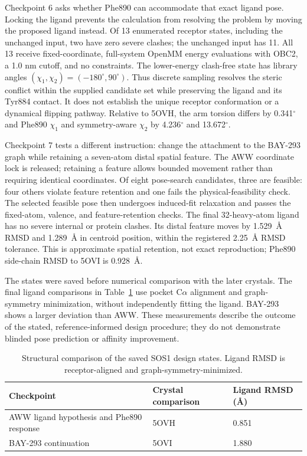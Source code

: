 \documentclass[11pt]{article}
\begin{document}
\begin{small}
Checkpoint 6 asks whether Phe890 can accommodate that exact ligand pose. Locking the ligand prevents the calculation from resolving the problem by moving the proposed ligand instead. Of 13 enumerated receptor states, including the unchanged input, two have zero severe clashes; the unchanged input has 11. All 13 receive fixed-coordinate, full-system OpenMM energy evaluations with OBC2, a 1.0 nm cutoff, and no constraints. The lower-energy clash-free state has library angles $(\chi_1,\chi_2)=(-180^{\circ},90^{\circ})$. Thus discrete sampling resolves the steric conflict within the supplied candidate set while preserving the ligand and its Tyr884 contact. It does not establish the unique receptor conformation or a dynamical flipping pathway. Relative to 5OVH, the arm torsion differs by 0.341$^{\circ}$ and Phe890 $\chi_1$ and symmetry-aware $\chi_2$ by 4.236$^{\circ}$ and 13.672$^{\circ}$.

Checkpoint 7 tests a different instruction: change the attachment to the BAY-293 graph while retaining a seven-atom distal spatial feature. The AWW coordinate lock is released; retaining a feature allows bounded movement rather than requiring identical coordinates. Of eight pose-search candidates, three are feasible: four others violate feature retention and one fails the physical-feasibility check. The selected feasible pose then undergoes induced-fit relaxation and passes the fixed-atom, valence, and feature-retention checks. The final 32-heavy-atom ligand has no severe internal or protein clashes. Its distal feature moves by 1.529~\AA{} RMSD and 1.289~\AA{} in centroid position, within the registered 2.25~\AA{} RMSD tolerance. This is approximate spatial retention, not exact reproduction; Phe890 side-chain RMSD to 5OVI is 0.928~\AA{}.

The states were saved before numerical comparison with the later crystals. The final ligand comparisons in Table~\ref{tab:appA_sos1_eval} use pocket C$\alpha$ alignment and graph-symmetry minimization, without independently fitting the ligand. BAY-293 shows a larger deviation than AWW. These measurements describe the outcome of the stated, reference-informed design procedure; they do not demonstrate blinded pose prediction or affinity improvement.


\begin{table}[htbp]
\centering\small
\caption{Structural comparison of the saved SOS1 design states. Ligand RMSD is receptor-aligned and graph-symmetry-minimized.}
\label{tab:appA_sos1_eval}
\begin{tabular}{@{}lll@{}}
\toprule
\textbf{Checkpoint} & \textbf{Crystal comparison} & \textbf{Ligand RMSD (\AA{})}\\
\midrule
AWW ligand hypothesis and Phe890 response & 5OVH & 0.851\\
BAY-293 continuation & 5OVI & 1.880\\
\bottomrule
\end{tabular}
\end{table}


\end{small}
\end{document}
